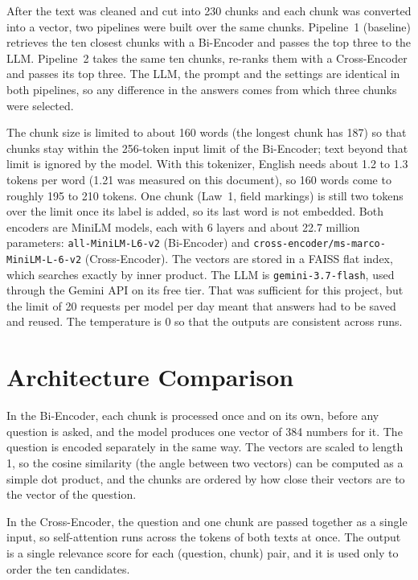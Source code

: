 \documentclass[11pt,a4paper]{article}
\begin{document}
After the text was cleaned and cut into 230 chunks and each chunk was converted into a vector, two pipelines were
built over the same chunks. Pipeline~1 (baseline) retrieves the ten closest chunks with a Bi-Encoder and passes the
top three to the LLM. Pipeline~2 takes the same ten chunks, re-ranks them with a Cross-Encoder and passes its top
three. The LLM, the prompt and the settings are identical in both pipelines, so any difference in the answers
comes from which three chunks were selected.

The chunk size is limited to about 160 words (the longest chunk has 187) so that chunks stay within the
256-token input limit of the Bi-Encoder; text beyond that limit is ignored by the model. With this tokenizer,
English needs about 1.2 to 1.3 tokens per word (1.21 was measured on this document), so 160 words come to roughly
195 to 210 tokens. One chunk (Law~1, field markings) is still two tokens over the limit once its label is added,
so its last word is not embedded. Both encoders are MiniLM models, each with 6 layers and about 22.7 million
parameters: \texttt{all-MiniLM-L6-v2} (Bi-Encoder) and \texttt{cross-encoder/ms-marco-MiniLM-L-6-v2}
(Cross-Encoder). The vectors are stored in a FAISS flat index, which searches exactly by inner product. The LLM is
\texttt{gemini-3.7-flash}, used through the Gemini API on its free tier. That was sufficient for this project, but
the limit of 20 requests per model per day meant that answers had to be saved and reused. The temperature is 0 so
that the outputs are consistent across runs.

\section{Architecture Comparison}

In the Bi-Encoder, each chunk is processed once and on its own, before any question is asked, and the model
produces one vector of 384 numbers for it. The question is encoded separately in the same way. The vectors are
scaled to length 1, so the cosine similarity (the angle between two vectors) can be computed as a simple dot
product, and the chunks are ordered by how close their vectors are to the vector of the question.

In the Cross-Encoder, the question and one chunk are passed together as a single input, so self-attention runs
across the tokens of both texts at once. The output is a single relevance score for each (question, chunk) pair,
and it is used only to order the ten candidates.
\end{document}
